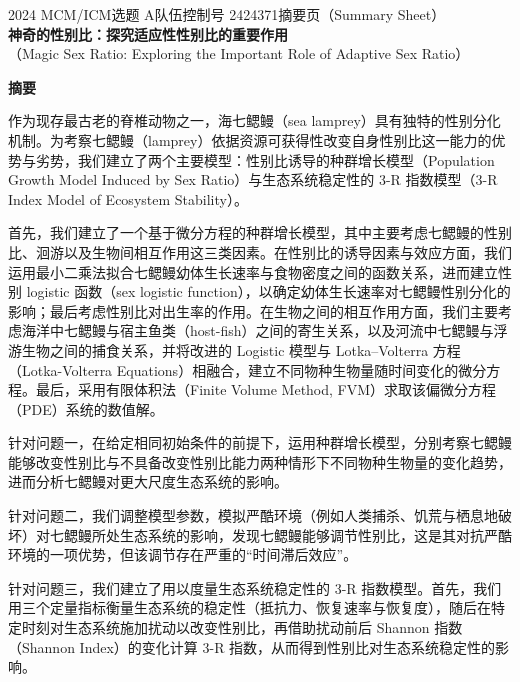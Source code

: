 \documentclass[11pt,a4paper]{ctexart}
\begin{document}
\thispagestyle{empty}
\begin{center}
{\small 2024 MCM/ICM\quad 选题 A\quad 队伍控制号 2424371\quad 摘要页（Summary Sheet）}\\[18pt]
{\LARGE\bfseries 神奇的性别比：探究适应性性别比的重要作用}\\[8pt]
{\large （Magic Sex Ratio: Exploring the Important Role of Adaptive Sex Ratio）}\\[10pt]
\end{center}

\begin{center}
{\large\bfseries 摘\quad 要}
\end{center}

\vspace{6pt}
作为现存最古老的脊椎动物之一，海七鳃鳗（sea lamprey）具有独特的性别分化机制。为考察七鳃鳗（lamprey）依据资源可获得性改变自身性别比这一能力的优势与劣势，我们建立了两个主要模型：性别比诱导的种群增长模型（Population Growth Model Induced by Sex Ratio）与生态系统稳定性的 3-R 指数模型（3-R Index Model of Ecosystem Stability）。

首先，我们建立了一个基于微分方程的种群增长模型，其中主要考虑七鳃鳗的性别比、洄游以及生物间相互作用这三类因素。在性别比的诱导因素与效应方面，我们运用最小二乘法拟合七鳃鳗幼体生长速率与食物密度之间的函数关系，进而建立性别 logistic 函数（sex logistic function），以确定幼体生长速率对七鳃鳗性别分化的影响；最后考虑性别比对出生率的作用。在生物之间的相互作用方面，我们主要考虑海洋中七鳃鳗与宿主鱼类（host-fish）之间的寄生关系，以及河流中七鳃鳗与浮游生物之间的捕食关系，并将改进的 Logistic 模型与 Lotka--Volterra 方程（Lotka-Volterra Equations）相融合，建立不同物种生物量随时间变化的微分方程。最后，采用有限体积法（Finite Volume Method, FVM）求取该偏微分方程（PDE）系统的数值解。

针对问题一，在给定相同初始条件的前提下，运用种群增长模型，分别考察七鳃鳗能够改变性别比与不具备改变性别比能力两种情形下不同物种生物量的变化趋势，进而分析七鳃鳗对更大尺度生态系统的影响。

针对问题二，我们调整模型参数，模拟严酷环境（例如人类捕杀、饥荒与栖息地破坏）对七鳃鳗所处生态系统的影响，发现七鳃鳗能够调节性别比，这是其对抗严酷环境的一项优势，但该调节存在严重的“时间滞后效应”。

针对问题三，我们建立了用以度量生态系统稳定性的 3-R 指数模型。首先，我们用三个定量指标衡量生态系统的稳定性（抵抗力、恢复速率与恢复度），随后在特定时刻对生态系统施加扰动以改变性别比，再借助扰动前后 Shannon 指数（Shannon Index）的变化计算 3-R 指数，从而得到性别比对生态系统稳定性的影响。
\end{document}
